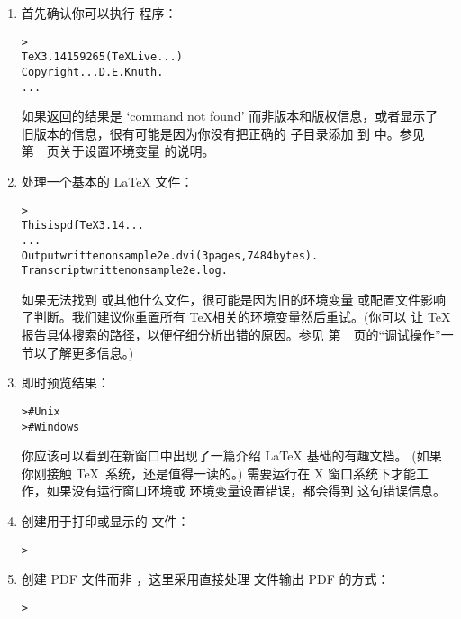 \documentclass{article}
\begin{document}
\begin{enumerate}

  \item 首先确认你可以执行  程序：
        \begin{alltt}
          > 
          TeX 3.14159265 (TeX Live ...)
          Copyright ... D.E. Knuth.
          ...
        \end{alltt}
        如果返回的结果是 `command not found' 而非版本和版权信息，或者显示了
        旧版本的信息，很有可能是因为你没有把正确的  子目录添加
        到  中。参见第~\pageref{sec:env}~页关于设置环境变量
        的说明。

  \item 处理一个基本的 \LaTeX{} 文件：
        \begin{alltt}
          > 
          This is pdfTeX 3.14...
          ...
          Output written on sample2e.dvi (3 pages, 7484 bytes).
          Transcript written on sample2e.log.
        \end{alltt}
        如果无法找到  或其他什么文件，很可能是因为旧的环境变量
        或配置文件影响了判断。我们建议你重置所有 \TeX 相关的环境变量然后重试。(你可以
        让 \TeX{} 报告具体搜索的路径，以便仔细分析出错的原因。参见
        第~\pageref{sec:debugging}~页的``调试操作''一节以了解更多信息。)

  \item 即时预览结果：
        \begin{alltt}
          >     # Unix
          >   # Windows
        \end{alltt}
        你应该可以看到在新窗口中出现了一篇介绍 \LaTeX{} 基础的有趣文档。
        (如果你刚接触 \TeX\ 系统，还是值得一读的。) 
        需要运行在 X 窗口系统下才能工作，如果没有运行窗口环境或
         环境变量设置错误，都会得到
         这句错误信息。

  \item 创建用于打印或显示的 \PS{} 文件：
        \begin{alltt}
          > 
        \end{alltt}

  \item 创建 PDF 文件而非 \dvi{}，这里采用直接处理 
        文件输出 PDF 的方式：
        \begin{alltt}
          > 
        \end{alltt}


\end{enumerate}
\end{document}
